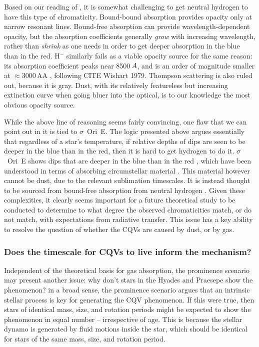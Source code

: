 \documentclass[11pt,twocolumn,tighten]{aastex63}
\begin{document}
Based on our reading of \citet[][Ch.~8]{1992oasp.book.....G},
it is somewhat challenging to get neutral hydrogen to have this type of chromaticity.
Bound-bound absorption provides opacity only at narrow resonant lines.
Bound-free absorption can provide wavelength-dependent opacity, but the
absorption coefficients generally {\it grow} with increasing wavelength, rather
than {\it shrink} as one needs in order to get deeper absorption in
the blue than in the red.  H$^-$ similarly fails as a viable opacity
source for the same reason: its absorption coefficient peaks near
8500\,$\AA$, and is an order of magnitude smaller at $\approx$3000\,AA
\citep{1992oasp.book.....G}, following CITE Wishart 1979.
Thompson scattering is also ruled out, because it is gray.
Dust, with its relatively featureless but increasing extinction curve
when going bluer into the optical, is to our knowledge the most
obvious opacity source.

While the above line of reasoning seems fairly convincing,
one flaw that we can point out in it is tied to $\sigma$~Ori~E.
The logic presented above argues essentially that regardless of a star's temperature,
if relative depths of dips are seen to be deeper in the blue than in the red,
then it is hard to get hydrogen to do it.
$\sigma$~Ori~E shows dips that are deeper in the blue than in the red \citep{1977ApJ...216L..31H},
which have been understood in terms of absorbing circumstellar material
\citep{2005ApJ...630L..81T}.
This material however cannot be dust, due to the relevant sublimation timescales.
It is instead thought to be sourced from bound-free absorption from neutral hydrogen
\citep{2005ApJ...630L..81T}.  Given these complexities, it clearly
seems important for a future theoretical study to be conducted to
determine to what degree the observed chromaticities match, or do not
match, with expectations from radiative transfer.
This issue has a key ability to resolve the question of whether the
CQVs are caused by dust, or by gas.

\subsubsection{Does the timescale for CQVs to live inform the mechanism?}
Independent of the theoretical basis for gas absorption, the
prominence scenario may present another issue: why don't stars in the
Hyades and Praesepe show the phenomenon?
in a broad sense, the prominence scenario argues that an intrinsic
stellar process is key for generating the CQV phenomenon.
If this were true, then stars of identical mass, size, and rotation
periods might be expected to show the phenomenon in equal number --
irrespective of age.
This is because the stellar dynamo is generated by fluid
motions inside the star, which should be identical for stars of the
same mass, size, and rotation period.
\end{document}
